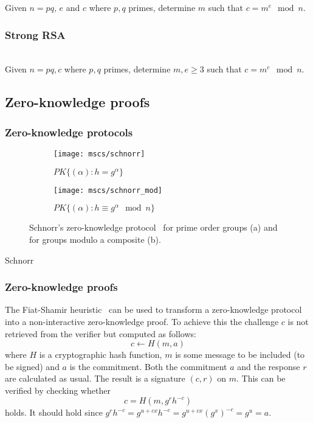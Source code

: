 Given $n = pq$, $e$ and $c$ where $p, q$ primes, determine $m$ such that $c = m^e \mod n$.

\subsubsection{Strong RSA}~\\

Given $n = pq, c$ where $p, q$ primes, determine $m, e \geq 3$ such that $c = m^e \mod n$.


\subsection{Zero-knowledge proofs}

\subsubsection{Zero-knowledge protocols}

\begin{figure}
  \centering
  \begin{subfigure}[b]{0.45\textwidth}
    \texttt{[image: mscs/schnorr]}
    \caption{$PK\{(\alpha) : h = g^\alpha \}$}
    \label{msc:schnorr}
  \end{subfigure}
  \quad
  \begin{subfigure}[b]{0.45\textwidth}
    \texttt{[image: mscs/schnorr\_mod]}
    \caption{$PK\{(\alpha) : h \equiv g^\alpha \mod n \}$}
    \label{msc:schnorr_mod}
  \end{subfigure}
  \caption{Schnorr's zero-knowledge protocol~\cite{Schnorr1991} for prime order groups (a) and for groups modulo a composite (b).}
  \label{fig:schnorr}
\end{figure}

Schnorr

\subsubsection{Zero-knowledge proofs}

The Fiat-Shamir heuristic~\cite{FiatShamir1987} can be used to transform a zero-knowledge protocol into a non-interactive zero-knowledge proof. To achieve this the challenge $c$ is not retrieved from the verifier but computed as follows: $$c \leftarrow H(m,a)$$ where $H$ is a cryptographic hash function, $m$ is some message to be included (to be signed) and $a$ is the commitment. Both the commitment $a$ and the response $r$ are calculated as usual. The result is a signature $(c,r)$ on $m$. This can be verified by checking whether $$c = H(m, g^r h^{-c})$$ holds. It should hold since $g^r h^{-c} = g^{u + cx} h^{-c} = g^{u + cx} (g^x)^{-c} = g^u = a$.


